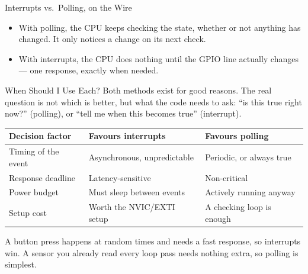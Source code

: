 \documentclass[9pt,aspectratio=169,xcolor=table]{beamer}
\newcommand{\striped}{\rowcolors{1}{white}{stripe}}
\begin{document}
\begin{frame}{Interrupts vs.\ Polling, on the Wire}
\begin{center}
{}
    \end{center}

    {\footnotesize \begin{itemize}
    		\item With
    		polling, the CPU keeps checking the state, whether or not anything
    		has changed. It only notices a change on its next check.
    		\item With interrupts, the CPU does nothing until the GPIO line
    		actually changes --- \alert{one} response, exactly when needed.
    	\end{itemize} }
\end{frame}

\begin{frame}{When Should I Use Each?}
	\leavevmode
	{\small Both methods exist for good reasons. The real question is not
		\alert{which is better}, but \alert{what the code needs to ask}: ``is
		this true right now?'' (polling), or ``tell me when this becomes
		true'' (interrupt).}

	\begin{center}
		{\small
			\striped
			\begin{tabular}{@{}l l l@{}}
				\toprule
				\textbf{Decision factor} & \textbf{Favours interrupts} & \textbf{Favours polling} \\
				\midrule
				Timing of the event & Asynchronous, unpredictable & Periodic, or always true \\
				Response deadline & Latency-sensitive & Non-critical \\
				Power budget & Must sleep between events & Actively running anyway \\
				Setup cost & Worth the NVIC/EXTI setup & A checking loop is enough \\
				\bottomrule
		\end{tabular}}
	\end{center}

	{\small A button press happens at random times and needs a fast
		response, so \alert{interrupts win}. A sensor you already read every
		loop pass needs nothing extra, so \alert{polling is simplest}.}
\end{frame}
\end{document}
